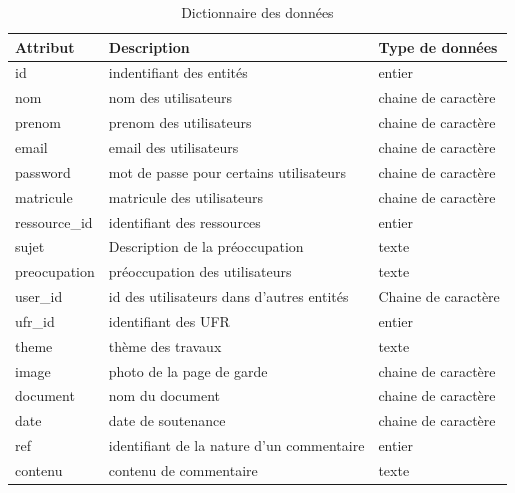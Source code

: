  
\begin{table}[h!]
    \centering
    \begin{tabular}{|p{4cm}|p{5cm}|p{4cm}|}
        \hline
      \textbf{Attribut}   & \textbf{Description} & 		   \textbf{Type de données}  \\
      \hline
       id & indentifiant des entités & entier \\
        \hline
  
   nom & nom des utilisateurs & chaine de caractère \\
      \hline
     
 prenom & prenom des utilisateurs & chaine de caractère \\
   \hline
         email & email des utilisateurs & chaine de caractère \\
        \hline
        password & mot de passe pour certains utilisateurs & chaine de caractère \\
   \hline
              matricule & matricule des utilisateurs & chaine de caractère \\
        \hline
         ressource\_id & identifiant des ressources & entier  \\
        \hline
         sujet & Description de la préoccupation & texte 
 \\
        \hline
         preocupation & préoccupation des utilisateurs & texte 
 \\        
        \hline
         user\_id & id des utilisateurs dans d'autres entités & Chaine de caractère \\
        \hline
         ufr\_id & identifiant des UFR & entier \\
        \hline
         theme & thème des travaux & texte \\
        \hline
         image & photo de la page de garde & chaine de caractère \\
        \hline
         document & nom du document & chaine de caractère \\
        \hline
         date & date de soutenance & chaine de caractère \\
        \hline
         ref & identifiant de la nature d'un commentaire & entier \\
        \hline
         contenu & contenu de commentaire & texte \\
        \hline
       
     
    \end{tabular}
    \caption{Dictionnaire des données}
    \label{Tableau:Dictionnaire des données}
\end{table}


